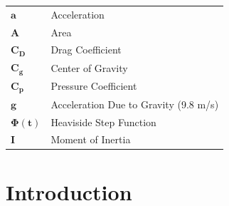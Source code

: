 \begin{table}[H]
\raggedright
{}
\begin{tabular}{>{\bfseries}L{2cm}L{13.65cm}}
$\mathbf{a}$		& Acceleration 							\\
$\mathbf{A}$		& Area      							\\
$\mathbf{C_D}$		& Drag Coefficient						\\
$\mathbf{C_g}$		& Center of Gravity						\\
$\mathbf{C_p}$		& Pressure Coefficient					\\
$\mathbf{g}$		& Acceleration Due to Gravity (9.8 m/s)	\\
$\mathbf{\Phi(t)}$	& Heaviside Step Function				\\
$\mathbf{I}$		& Moment of Inertia						\\
\end{tabular}
\end{table}
\newpage
\section{Introduction}

